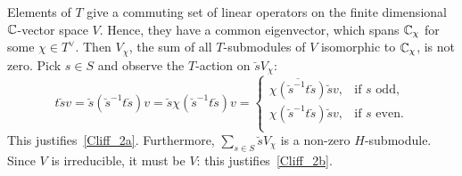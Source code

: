 \begin{just}
  Elements of $T$ give a commuting set of linear operators on the finite dimensional ${\mathbb C}$-vector space $V$.
  Hence, they have a common eigenvector, which spans ${\mathbb C}_\chi$ for some $\chi\in T^\vee$.
  Then $V_\chi$, the sum of all $T$-submodules of $V$ isomorphic to ${\mathbb C}_\chi$, is not zero. Pick $s\in S$ and observe the $T$-action on $\breve{s}V_\chi$:
\begin{equation} \label{Cliff_3a}
  t\breve{s} v = \breve{s}(\breve{s}^{-1}t\breve{s})v = \breve{s} \chi (\breve{s}^{-1}t\breve{s}) v =
  \begin{cases}
    \overline{\chi (\breve{s}^{-1}t\breve{s})}   \breve{s}v , & \text{if $s$ odd,}\\
    \chi (\breve{s}^{-1}t\breve{s})          \breve{s}v , & \text{if $s$ even.}\\
  \end{cases}
\end{equation}
This justifies~\eqref{Cliff_2a}. Furthermore, $\sum_{s\in S} \breve{s}V_\chi$ is a non-zero  $H$-submodule. Since $V$ is irreducible,
it must be $V$: this justifies~\eqref{Cliff_2b}.
\end{just}

